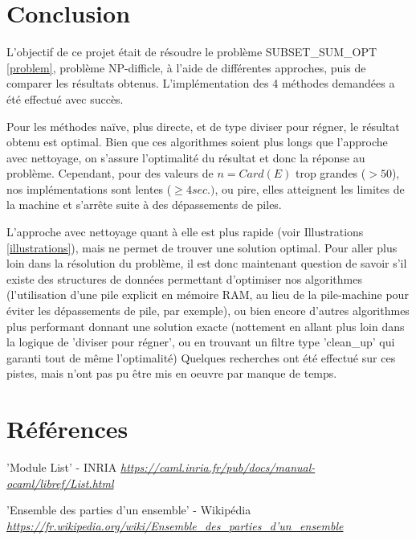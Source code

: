 \documentclass[10pt]{article}
\begin{document}
		\section{Conclusion}
			L'objectif de ce projet était de résoudre le problème SUBSET\_SUM\_OPT \ref{problem}, problème NP-difficle,
			à l'aide de différentes approches, puis de comparer les résultats obtenus.
			\newline
			\newline
			L'implémentation des 4 méthodes demandées a été effectué avec succès.
			\newline
			
			Pour les méthodes naïve, plus directe, et de type diviser pour régner, le résultat obtenu est optimal.
			Bien que ces algorithmes soient plus longs que l'approche avec nettoyage, on s'assure l'optimalité du résultat
			et donc la réponse au problème.
			\newline
			Cependant, pour des valeurs de $n = Card(E)$ trop grandes ($ > 50$), nos implémentations sont lentes ($\geq 4 sec.)$,
			ou pire, elles atteignent les limites de la machine et s'arrête suite à des dépassements de piles.
			\newline
			
			L'approche avec nettoyage quant à elle est plus rapide (voir Illustrations \ref{illustrations}),
			mais ne permet de trouver une solution optimal.
			\newline
			\newline
			Pour aller plus loin dans la résolution du problème, il est donc maintenant question de savoir
			s'il existe des structures de données permettant d'optimiser nos algorithmes
			(l'utilisation d'une pile explicit en mémoire RAM, au lieu de la pile-machine pour éviter les dépassements de pile, par exemple),
			ou bien encore d'autres algorithmes plus performant donnant une solution exacte (nottement en allant plus loin dans la logique
			de 'diviser pour régner', ou en trouvant un filtre type 'clean\_up' qui garanti tout de même l'optimalité)
			\newline
			\newline
			Quelques recherches ont été effectué sur ces pistes, mais n'ont pas pu être mis en oeuvre par manque de temps.
			
	\newpage
	\section{Références}
		\begin{thebibliography}{}
				'Module List' - INRIA\newline
				\href{https://caml.inria.fr/pub/docs/manual-ocaml/libref/List.html}
				      {\textit{https://caml.inria.fr/pub/docs/manual-ocaml/libref/List.html}}
				      
				'Ensemble des parties d'un ensemble' - Wikipédia\newline
				\href{https://fr.wikipedia.org/wiki/Ensemble\_des\_parties\_d'un\_ensemble}
				      {\textit{https://fr.wikipedia.org/wiki/Ensemble\_des\_parties\_d'un\_ensemble}}
				      
  \end{thebibliography}
\end{document}
